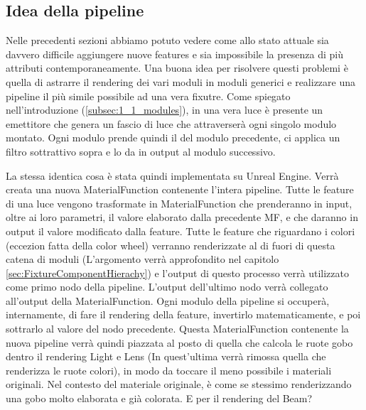\documentclass[main.tex]{subfiles}
\begin{document}
\subsection{Idea della pipeline}\label{subsec:2_pipelineIdea}
Nelle precedenti sezioni abbiamo potuto vedere come allo stato attuale sia davvero difficile aggiungere nuove features e sia impossibile la presenza di più attributi contemporaneamente. Una buona idea per risolvere questi problemi è quella di astrarre il rendering dei vari moduli in moduli generici e realizzare una pipeline il più simile possibile ad una vera fixutre. Come spiegato nell'introduzione (\ref{subsec:1_1_modules}), in una vera luce è presente un emettitore che genera un fascio di luce che attraverserà ogni singolo modulo montato. Ogni modulo prende quindi il  del modulo precedente, ci applica un filtro sottrattivo sopra e lo da in output al modulo successivo. \newline

La stessa identica cosa è stata quindi implementata su Unreal Engine. Verrà creata una nuova MaterialFunction contenente l'intera pipeline. Tutte le feature di una luce vengono trasformate in MaterialFunction che prenderanno in input, oltre ai loro parametri, il valore elaborato dalla precedente MF, e che daranno in output il valore modificato dalla feature. Tutte le feature che riguardano i colori (eccezion fatta della color wheel) verranno renderizzate al di fuori di questa catena di moduli (L'argomento verrà approfondito nel capitolo \ref{sec:FixtureComponentHierachy}) e l'output di questo processo verrà utilizzato come primo nodo della pipeline. L'output dell'ultimo nodo verrà collegato all'output della MaterialFunction. Ogni modulo della pipeline si occuperà, internamente, di fare il rendering della feature, invertirlo matematicamente, e poi sottrarlo al valore del nodo precedente. \newline
Questa MaterialFunction contenente la nuova pipeline verrà quindi piazzata al posto di quella che calcola le ruote gobo dentro il rendering Light e Lens (In quest'ultima verrà rimossa quella che renderizza le ruote colori), in modo da toccare il meno possibile i materiali originali. Nel contesto del materiale originale, è come se stessimo renderizzando una gobo molto elaborata e già colorata. \newline
E per il rendering del Beam?
\end{document}
